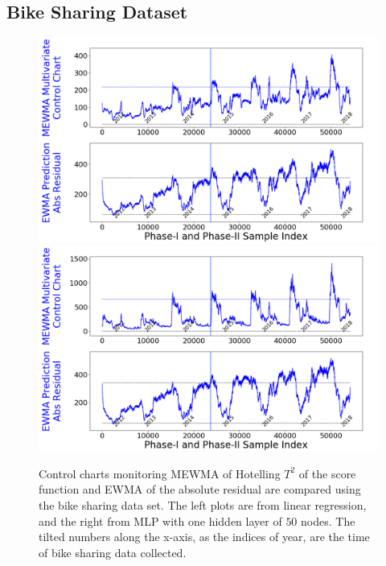 \documentclass[twoside,11pt]{article}
\begin{document}
\subsection{Bike Sharing Dataset}
\label{ss:bs_ds}
\begin{figure}[!htbp]
\centering
\includegraphics[width = 0.49\linewidth]{../figures/v14/bike_sharing/reg_scal_train/bike_reg_1e-08_0_0001_0_005_99_0.png}
\includegraphics[width = 0.49\linewidth]{../figures/v14/bike_sharing/reg_nnet_scal_train/bike_reg_0_1_0_0001_0_005_99_0.png}
  \caption{
Control charts monitoring MEWMA of Hotelling $T^2$ of the score function and EWMA of the absolute residual are compared using the bike sharing data set. The left plots are from linear regression, and the right from MLP with one hidden layer of $50$ nodes. The tilted numbers along the x-axis, as the indices of year, are the time of bike sharing data collected.
}
\end{figure}
\end{document}
